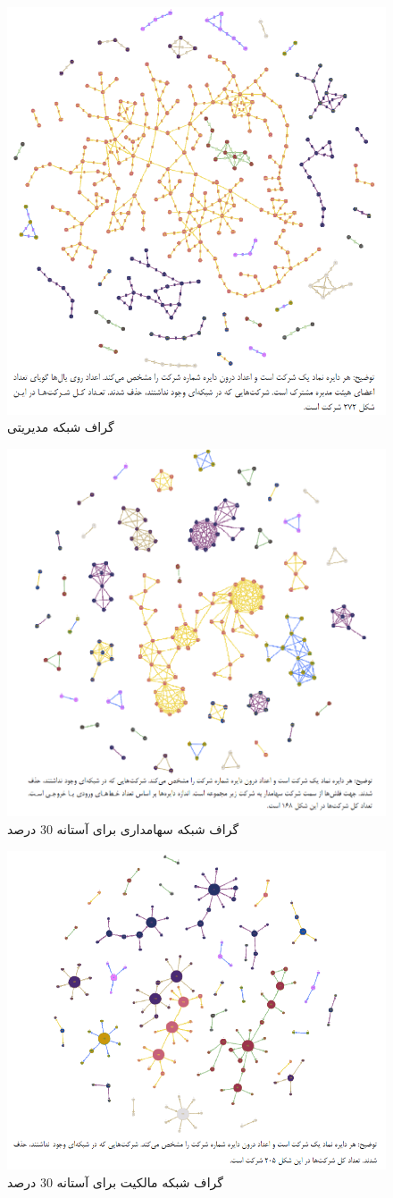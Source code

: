 \documentclass[12pt]{article}
\begin{document}
\begin{figure}[htbp]
\centering
  \includegraphics[width=0.6\linewidth]{m.png}
  \caption{گراف شبکه مدیریتی }
  \label{m}
 \end{figure} 
\begin{figure}[htbp]
\centering
  \includegraphics[width=0.6\linewidth]{h1.png}
  \caption{گراف شبکه سهامداری برای آستانه 30 درصد }
  \label{h1}
 \end{figure}
 \begin{figure}[htbp]
 \centering
   \includegraphics[width=0.6\linewidth]{h.png}
   \caption{گراف شبکه مالکیت برای آستانه 30 درصد }
   \label{h}
  \end{figure}
\FloatBarrier
\end{document}
